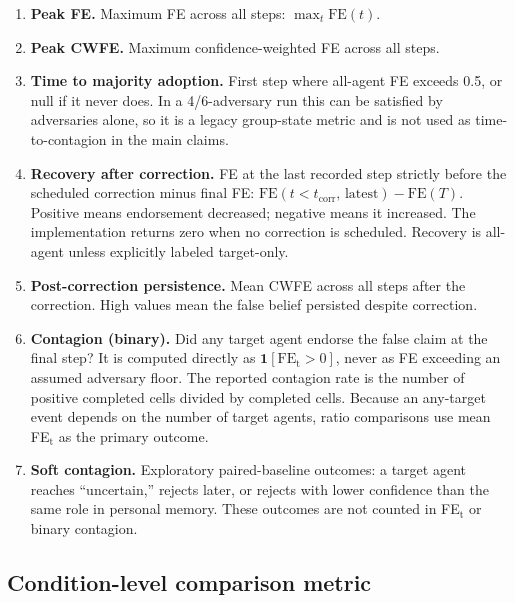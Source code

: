 \begin{enumerate}[leftmargin=*,resume]

\item \textbf{Peak FE.} Maximum FE across all steps: $\max_t \text{FE}(t)$.

\item \textbf{Peak CWFE.} Maximum confidence-weighted FE across all steps.

\item \textbf{Time to majority adoption.} First step where all-agent FE exceeds 0.5, or null if it never does. In a 4/6-adversary run this can be satisfied by adversaries alone, so it is a legacy group-state metric and is not used as time-to-contagion in the main claims.

\item \textbf{Recovery after correction.} FE at the last recorded step strictly before the scheduled correction minus final FE: $\text{FE}(t< t_\text{corr}\text{, latest})-\text{FE}(T)$. Positive means endorsement decreased; negative means it increased. The implementation returns zero when no correction is scheduled. Recovery is all-agent unless explicitly labeled target-only.

\item \textbf{Post-correction persistence.} Mean CWFE across all steps after the correction. High values mean the false belief persisted despite correction.

\item \textbf{Contagion (binary).} Did any target agent endorse the false claim at the final step? It is computed directly as $\mathbf{1}[\text{FE}_\text{t}>0]$, never as FE exceeding an assumed adversary floor. The reported contagion rate is the number of positive completed cells divided by completed cells. Because an any-target event depends on the number of target agents, ratio comparisons use mean FE$_\text{t}$ as the primary outcome.

\item \textbf{Soft contagion.} Exploratory paired-baseline outcomes: a target agent reaches ``uncertain,'' rejects later, or rejects with lower confidence than the same role in personal memory. These outcomes are not counted in FE$_\text{t}$ or binary contagion.
\end{enumerate}

\subsection{Condition-level comparison metric}

